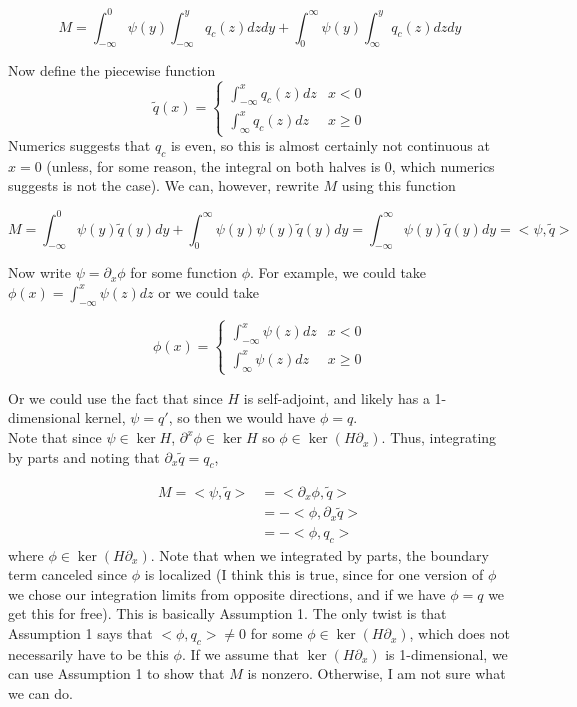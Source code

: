 \documentclass[12pt]{article}
\begin{document}
\[
M = \int_{-\infty}^0 \psi(y) \int_{-\infty}^y q_c(z) dz dy + \int_0^\infty \psi(y) \int_{\infty}^y q_c(z) dz dy 
\]

Now define the piecewise function
\[
\tilde{q}(x) = \begin{cases}
\int_{-\infty}^x q_c(z) dz & x < 0 \\
\int_{\infty}^x q_c(z) dz & x \geq 0
\end{cases}
\]
Numerics suggests that $q_c$ is even, so this is almost certainly not continuous at $x = 0$ (unless, for some reason, the integral on both halves is 0, which numerics suggests is not the case). We can, however, rewrite $M$ using this function

\[
M = \int_{-\infty}^0 \psi(y) \tilde{q}(y) dy + \int_0^\infty \psi(y) \psi(y) \tilde{q}(y) dy = \int_{-\infty}^\infty \psi(y) \tilde{q}(y) dy = <\psi, \tilde{q}>
\]

Now write $\psi = \partial_x \phi$ for some function $\phi$. For example, we could take $\phi(x) = \int_{-\infty}^x \psi(z) dz$ or we could take 

\[
\phi(x) = \begin{cases}
\int_{-\infty}^x \psi(z) dz & x < 0 \\
\int_{\infty}^x \psi(z) dz & x \geq 0
\end{cases}
\]

Or we could use the fact that since $H$ is self-adjoint, and likely has a 1-dimensional kernel, $\psi = q'$, so then we would have $\phi = q$.\\

Note that since $\psi \in \ker H$, $\partial^x \phi \in \ker H$ so $\phi \in \ker (H \partial_x)$. Thus, integrating by parts and noting that $\partial_x \tilde{q} = q_c$,

\begin{align*}
M = <\psi, \tilde{q}> &= <\partial_x \phi, \tilde{q}> \\
&= -<\phi, \partial_x \tilde{q}> \\
&= -<\phi, q_c>
\end{align*}
where $\phi \in \ker (H \partial_x)$. Note that when we integrated by parts, the boundary term canceled since $\phi$ is localized (I think this is true, since for one version of $\phi$ we chose our integration limits from opposite directions, and if we have $\phi = q$ we get this for free). This is basically Assumption 1. The only twist is that Assumption 1 says that $<\phi, q_c> \neq 0$ for some $\phi \in \ker (H \partial_x)$, which does not necessarily have to be this $\phi$. If we assume that $\ker (H \partial_x)$ is 1-dimensional, we can use Assumption 1 to show that $M$ is nonzero. Otherwise, I am not sure what we can do.\\
\end{document}

